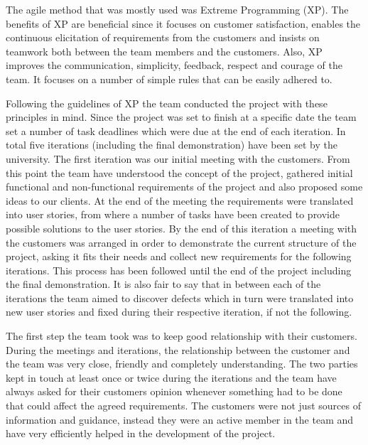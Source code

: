 \documentclass{l3proj}
\begin{document}
The agile method that was mostly used was Extreme Programming (XP). The benefits of XP are beneficial since it focuses on
customer satisfaction, enables the continuous elicitation of requirements from the customers and insists on teamwork
both between the team members and the customers. Also, XP improves the communication, simplicity, feedback, respect and
courage of the team. It focuses on a number of simple rules that can be easily adhered to.

Following the guidelines of XP the team conducted the project with these principles in mind. Since the project was set to finish at a specific date
the team set a number of task deadlines which were due at the end of each iteration. In total five iterations
(including the final demonstration) have been set by the university. The first iteration was our initial meeting with
the customers. From this point the team have understood the concept of the project, gathered initial functional and non-functional
requirements of the project and also proposed some ideas to our clients. At the end of the meeting the requirements were
translated into user stories, from where a number of tasks have been created to provide possible solutions to the user stories.
By the end of this iteration a meeting with the customers was arranged in order to demonstrate the current structure of the
project, asking it fits their needs and collect new requirements for the following iterations. This process has been followed
until the end of the project including the final demonstration. It is also fair to say that in between each of the iterations the team
aimed to discover defects which in turn were translated into new user stories and fixed during their respective iteration,
if not the following.

The first step the team took was to keep good relationship with their customers. During the meetings and iterations, the relationship
between the customer and the team was very close, friendly and completely understanding. The two parties kept in touch at least once or twice during the
iterations and the team have always asked for their customers opinion whenever something had to be done that could affect the agreed requirements.
The customers were not just sources of information and guidance, instead they were an active member in the team and have very
efficiently helped in the development of the project.
\end{document}
